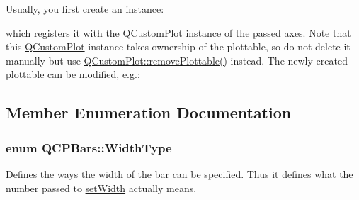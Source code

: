 Usually, you first create an instance\+: 
\begin{DoxyCodeInclude}
\end{DoxyCodeInclude}
which registers it with the \hyperlink{classQCustomPlot}{Q\+Custom\+Plot} instance of the passed axes. Note that this \hyperlink{classQCustomPlot}{Q\+Custom\+Plot} instance takes ownership of the plottable, so do not delete it manually but use \hyperlink{classQCustomPlot_af3dafd56884208474f311d6226513ab2}{Q\+Custom\+Plot\+::remove\+Plottable()} instead. The newly created plottable can be modified, e.\+g.\+: 
\begin{DoxyCodeInclude}
\end{DoxyCodeInclude}


\subsection{Member Enumeration Documentation}
\subsubsection[{\texorpdfstring{Width\+Type}{WidthType}}]{\setlength{\rightskip}{0pt plus 5cm}enum {\bf Q\+C\+P\+Bars\+::\+Width\+Type}}\hypertarget{classQCPBars_a65dbbf1ab41cbe993d71521096ed4649}{}\label{classQCPBars_a65dbbf1ab41cbe993d71521096ed4649}
Defines the ways the width of the bar can be specified. Thus it defines what the number passed to \hyperlink{classQCPBars_afec6116579d44d5b706e0fa5e5332507}{set\+Width} actually means.

